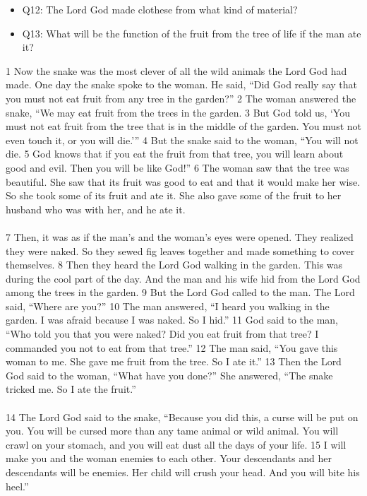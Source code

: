 \begin{itemize}
\item Q12: The Lord God made clothese from what kind of material?
\item Q13: What will be the function of the fruit from the tree of life if the man ate it?
\end{itemize}

\newpage
1 Now the snake was the most clever of all the wild animals the Lord God had made. One day the snake spoke to the woman. He said, “Did God really say that you must not eat fruit from any tree in the garden?” 2 The woman answered the snake, “We may eat fruit from the trees in the garden. 3 But God told us, ‘You must not eat fruit from the tree that is in the middle of the garden. You must not even touch it, or you will die.’” 4 But the snake said to the woman, “You will not die. 5 God knows that if you eat the fruit from that tree, you will learn about good and evil. Then you will be like God!” 6 The woman saw that the tree was beautiful. She saw that its fruit was good to eat and that it would make her wise. So she took some of its fruit and ate it. She also gave some of the fruit to her husband who was with her, and he ate it.\\
\\
7 Then, it was as if the man’s and the woman’s eyes were opened. They realized they were naked. So they sewed fig leaves together and made something to cover themselves. 8 Then they heard the Lord God walking in the garden. This was during the cool part of the day. And the man and his wife hid from the Lord God among the trees in the garden. 9 But the Lord God called to the man. The Lord said, “Where are you?” 10 The man answered, “I heard you walking in the garden. I was afraid because I was naked. So I hid.” 11 God said to the man, “Who told you that you were naked? Did you eat fruit from that tree? I commanded you not to eat from that tree.” 12 The man said, “You gave this woman to me. She gave me fruit from the tree. So I ate it.”
13 Then the Lord God said to the woman, “What have you done?” She answered, “The snake tricked me. So I ate the fruit.”\\
\\
14 The Lord God said to the snake, “Because you did this, a curse will be put on you. You will be cursed more than any tame animal or wild animal. You will crawl on your stomach, and you will eat dust all the days of your life. 15 I will make you and the woman enemies to each other. Your descendants and her descendants will be enemies. Her child will crush your head. And you will bite his heel.”
